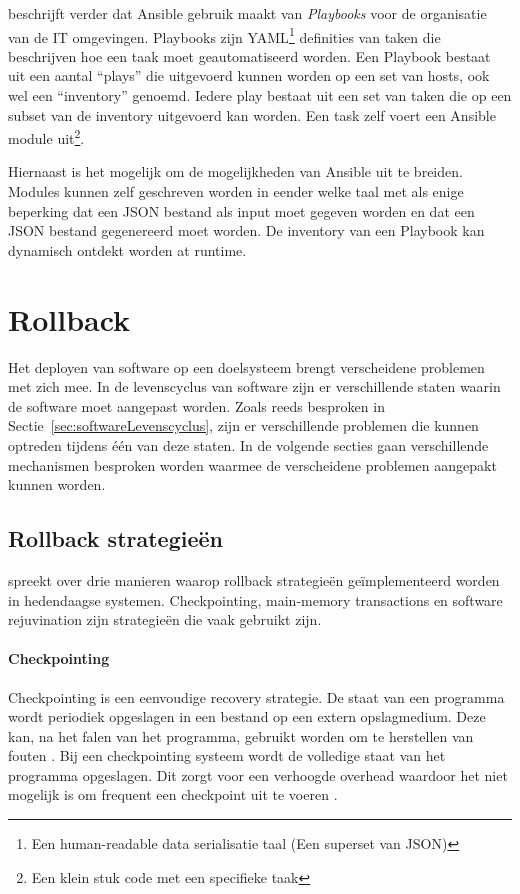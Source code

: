 \citet{ansible} beschrijft verder dat Ansible gebruik maakt van \emph{Playbooks} voor de organisatie van de IT omgevingen.
Playbooks zijn YAML\footnote{Een human-readable data serialisatie taal (Een superset van JSON)} definities van taken die beschrijven hoe een taak moet geautomatiseerd worden.
Een Playbook bestaat uit een aantal ``plays'' die uitgevoerd kunnen worden op een set van hosts, ook wel een ``inventory'' genoemd.
Iedere play bestaat uit een set van taken die op een subset van de inventory uitgevoerd kan worden.
Een task zelf voert een Ansible module uit\footnote{Een klein stuk code met een specifieke taak}.

Hiernaast is het mogelijk om de mogelijkheden van Ansible uit te breiden.
Modules kunnen zelf geschreven worden in eender welke taal met als enige beperking dat een JSON bestand als input moet gegeven worden en dat een JSON bestand gegenereerd moet worden.
De inventory van een Playbook kan dynamisch ontdekt worden at runtime.

\section{Rollback}\label{sec:rollback}
Het deployen van software op een doelsysteem brengt verscheidene problemen met zich mee.
In de levenscyclus van software zijn er verschillende staten waarin de software moet aangepast worden.
Zoals reeds besproken in Sectie~\vref{sec:softwareLevenscyclus}, zijn er verschillende problemen die kunnen optreden tijdens één van deze staten.
In de volgende secties gaan verschillende mechanismen besproken worden waarmee de verscheidene problemen aangepakt kunnen worden.

\subsection{Rollback strategieën}
\citet{srinivasan2004flashback} spreekt over drie manieren waarop rollback strategieën geïmplementeerd worden in hedendaagse systemen.
Checkpointing, main-memory transactions en software rejuvination zijn strategieën die vaak gebruikt zijn.

\paragraph{Checkpointing}
Checkpointing is een eenvoudige recovery strategie.
De staat van een programma wordt periodiek opgeslagen in een bestand op een extern opslagmedium.
Deze kan, na het falen van het programma, gebruikt worden om te herstellen van fouten \citep{plank1994libckpt}.
Bij een checkpointing systeem wordt de volledige staat van het programma opgeslagen.
Dit zorgt voor een verhoogde overhead waardoor het niet mogelijk is om frequent een checkpoint uit te voeren \citep{srinivasan2004flashback}.

